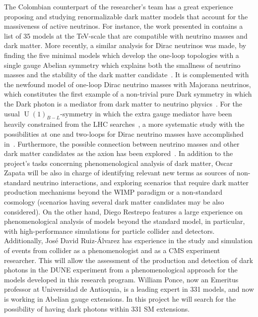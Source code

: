 \documentclass[a4paper,10pt,epsfig,epsf,amsfonts,amsmath]{article}
\begin{document}
  The Colombian counterpart of the researcher's team has a great experience 
  proposing and studying renormalizable dark matter models that account
  for the massiveness of active neutrinos. For instance, the work presented in \cite{Restrepo:2013aga} contains a list of 35 models at the TeV-scale
  that are compatible with neutrino masses and dark matter. More recently, 
  a similar analysis for Dirac neutrinos was made, by finding the five minimal models
  which develop the one-loop topologies with a single gauge Abelian symmetry which explains both the smallness of neutrino masses and the stability of the dark matter
  candidate~\cite{Calle:2018ovc}. It is complemented with the newfound model of
  one-loop Dirac neutrino masses with Majorana neutrinos, which constitutes the first example of a non-trivial pure Dark symmetry in which the Dark photon is a mediator from dark matter to neutrino physics~\cite{Calle:2019mxn}.
  For the usual $\operatorname{U}(1)_{B-L}$-symmetry in which the extra gauge 
  mediator have been heavily constrained from the LHC searches~\cite{Chiang:2019ajm},
  a more systematic study with the possibilities at one and two-loops for Dirac neutrino masses have accomplished in~\cite{Jana:2019mgj}.
  Furthermore, the possible connection between neutrino masses and other 
  dark matter candidates as the axion has been explored~\cite{Carvajal:2018ohk}.  
  In addition to the project's tasks concerning phenomenological 
  analysis of dark matter, Oscar Zapata will be also in charge of identifying 
  relevant new terms as sources of non-standard neutrino interactions,  and exploring scenarios that require
  dark matter production mechanisms beyond the WIMP paradigm or a 
  non-standard cosmology 
  (scenarios having several dark matter candidates may be also considered).
  On the other hand, Diego Restrepo features a large experience on
  phenomenological analysis of models beyond the standard model, in
  particular, with high-performance simulations for particle collider
  and detectors. Additionally, José David Ruiz-Álvarez has experience
  in the study and simulation of events from collider as a
  phenomenologist and as a CMS experiment researcher. This will allow
  the assessment of the production and detection of dark photons in
  the DUNE experiment from a phenomenological approach for the models
  developed in this research program.  William Ponce, now an Emeritus
  professor at Universidad de Antioquia, is a leading expert in 331
  models, and now is working in Abelian gauge extensions. In this
  project he will search for the possibility of having dark photons
  within 331 SM extensions.
  
\end{document}
